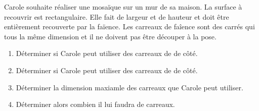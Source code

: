     Carole souhaite réaliser une mosaïque sur un mur de sa maison. La surface à recouvrir est rectangulaire.
    Elle fait  de largeur et  de hauteur et doit être entièrement recouverte par la faïence.
    Les carreaux de faîence sont des carrés qui tous la même dimension et il ne doivent pas être découper à la pose.

    \begin{enumerate}
        \item Déterminer si Carole peut utiliser des carreaux de  de côté.
        \item Déterminer si Carole peut utiliser des carreaux de  de côté.
        \item Déterminer la dimension maxiamle des carreaux que Carole peut utiliser.
        \item Déterminer alors combien il lui faudra de carreaux.
    \end{enumerate}
